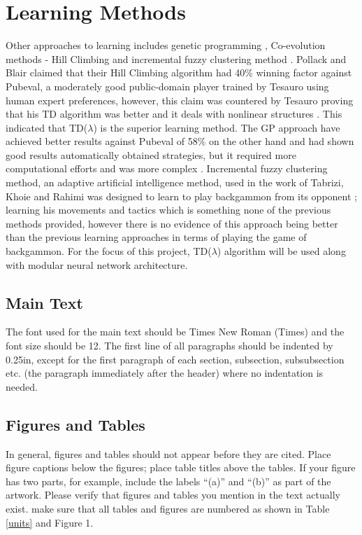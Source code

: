 \documentclass[12pt,a4paper]{article}
\begin{document}
\section*{Learning Methods}
Other approaches to learning includes genetic programming \cite{DBLP:journals/gpem/AzariaS05}, Co-evolution methods - Hill Climbing \cite{DBLP:journals/ml/PollackB98} and incremental fuzzy clustering method \cite{DBLP:conf/nafips/TabriziKR15}. Pollack and Blair claimed that their Hill Climbing algorithm had 40\% winning factor against Pubeval, a moderately good public-domain player trained by Tesauro using human expert preferences, however, this claim was countered by Tesauro proving that his TD algorithm was better and it deals with nonlinear structures \cite{DBLP:journals/ml/Tesauro98}. This indicated that TD($\lambda$) is the superior learning method. The GP approach have achieved better results against Pubeval of 58\% on the other hand and had shown good results automatically obtained strategies, but it required more computational efforts and was more complex \cite{DBLP:journals/gpem/AzariaS05}. Incremental fuzzy clustering method, an adaptive artificial intelligence method, used in the work of Tabrizi, Khoie and Rahimi was designed to learn to play backgammon from its opponent \cite{DBLP:conf/nafips/TabriziKR15}; learning his movements and tactics which is something none of the previous methods provided, however there is no evidence of this approach being better than the previous learning approaches in terms of playing the game of backgammon. For the focus of this project, TD($\lambda$) algorithm will be used along with modular neural network architecture.


\subsection{Main Text}

The font used for the main text should be Times New Roman (Times) and the font size should be 12.  The first line of all paragraphs should be indented by 0.25in, except for the first paragraph of each section, subsection, subsubsection etc. (the paragraph immediately after the header) where no indentation is needed.

\subsection{Figures and Tables}
In general, figures and tables should not appear before they are cited.  Place figure captions below the figures; place table titles above the tables.  If your figure has two parts, for example, include the labels ``(a)'' and ``(b)'' as part of the artwork.  Please verify that figures and tables you mention in the text actually exist.  make sure that all tables and figures are numbered as shown in Table \ref{units} and Figure 1.
\end{document}

